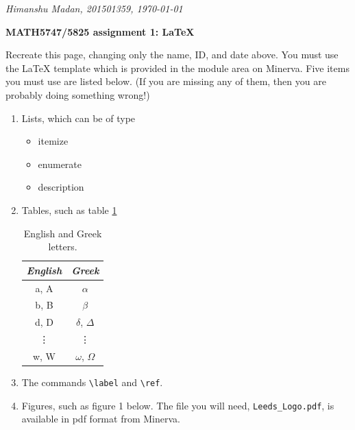 \documentclass[10pt, a4paper]{article}
\begin{document}
\begin{flushright}
\UKvardate
{\em Himanshu Madan, 201501359, \today}
\end{flushright}
\begin{center}
    {\bf \Large MATH5747/5825 assignment 1: {\LaTeX} }
\end{center}

{\indent Recreate this page, changing only the name, ID, and date above. You must use the {\LaTeX} template which is provided in the module area on Minerva. Five items you must use are listed below. (If you are missing any of them, then you are probably doing something wrong!)}
\begin{enumerate}
    \item Lists, which can be of type
        \begin{itemize}
            \item 
                itemize
            \item 
                enumerate
            \item
                description
        \end{itemize}
    \item 
        Tables, such as table \ref{tab:Table1}
    \begin{table}[h!]
    \begin{center}
        \begin{tabular}{c|c}
        {\em English} & {\em Greek}\\
        \hline
        a, A & $\alpha$\\
        b, B & $\beta$\\
        d, D & $\delta$, $\Delta$\\
        \vdots & \vdots\\
        w, W & $\omega$, $\Omega$
        \end{tabular}
    \end{center}
    \caption{English and Greek letters.}
    \label{tab:Table1}
    \end{table}
    \item
    The commands \verb|\label| and \verb|\ref|.
    \item 
    Figures, such as figure 1 below. The file you will need, \verb|Leeds_Logo.pdf|, is available in pdf format  from Minerva.

\end{enumerate}
\end{document}
